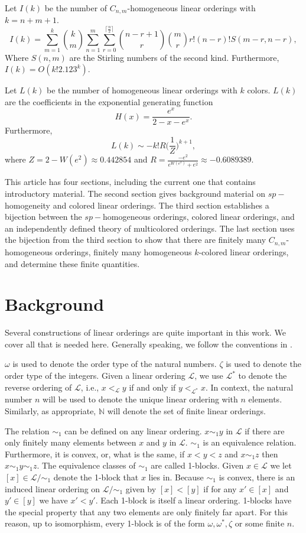\documentclass[11pt]{amsart}
\theoremstyle{definition}
\def\L{\mathcal L}
\begin{document}
\begin{theorem}
    Let $I(k)$ be the number of $C_{n,m}$-homogeneous linear orderings with $k=n+m+1$.
    \[I(k)=\sum_{m=1}^k{k \choose m}\sum_{n=1}^m\sum_{r=0}^{\lceil \frac{n}2 \rceil}{n-r+1 \choose r}{m \choose r}r!(n-r)!S(m-r,n-r),\]
    Where $S(n,m)$ are the Stirling numbers of the second kind.
    Furthermore, $I(k)=O(k!2.123^k)$.

    Let $L(k)$ be the number of homogeneous linear orderings with $k$ colors.
    $L(k)$ are the coefficients in the exponential generating function
    \[H(x)=\frac{e^x}{2-x-e^x}.\]
    Furthermore,
    \[L(k)\sim -k!R\Big(\frac1Z\Big)^{k+1},\]
    where $Z=2-W(e^2)\approx0.442854$ and $R=\frac{-e^2}{e^{W(e^2)}+e^2}\approx-0.6089389.$
\end{theorem}


This article has four sections, including the current one that contains introductory material.
The second section gives background material on $sp-$homogeneity and colored linear orderings.
The third section establishes a bijection between the $sp-$homogeneous orderings, colored linear orderings, and an independently defined theory of multicolored orderings.
The last section uses the bijection from the third section to show that there are finitely many $C_{n,m}$-homogeneous orderings, finitely many homogeneous $k$-colored linear orderings, and determine these finite quantities.

\section{Background}

Several constructions of linear orderings are quite important in this work.
We cover all that is needed here.
Generally speaking, we follow the conventions in \cite{Ros}.

$\omega$ is used to denote the order type of the natural numbers.
$\zeta$ is used to denote the order type of the integers.
Given a linear ordering $\L$, we use $\L^*$ to denote the reverse ordering of $\L$, i.e., $x<_\L y$ if and only if $y<_{\L^*}x$.
In context, the natural number $n$ will be used to denote the unique linear ordering with $n$ elements.
Similarly, as appropriate, $\mathbb{N}$ will denote the set of finite linear orderings.

The relation $\sim_1$ can be defined on any linear ordering.
$x\sim_1y$ in $\L$ if there are only finitely many elements between $x$ and $y$ in $\L$.
$\sim_1$ is an equivalence relation.
Furthermore, it is convex, or, what is the same, if $x<y<z$ and $x\sim_1z$ then $x\sim_1y\sim_1z$.
The equivalence classes of $\sim_1$ are called 1-blocks.
Given $x\in\L$ we let $[x]\in \L/\sim_1$ denote the 1-block that $x$ lies in.
Because $\sim_1$ is convex, there is an induced linear ordering on $\L/\sim_1$ given by $[x]<[y]$ if for any $x'\in[x]$ and $y'\in[y]$ we have $x'<y'$.
Each 1-block is itself a linear ordering.
1-blocks have the special property that any two elements are only finitely far apart.
For this reason, up to isomorphism, every 1-block is of the form $\omega,\omega^*,\zeta$ or some finite $n$.
\end{document}
